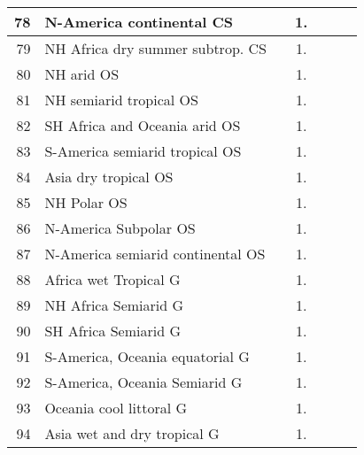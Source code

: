 {{\begin{tabular}{||r|l||c|c|c|c|c||}
 \hline
          78  & N-America continental CS                                     &       &  1.   &       &       \\
 \hline
          79  & NH Africa dry summer subtrop. CS                             &       &  1.   &       &       \\
 \hline
 \hline
          80  & NH arid OS                                                   &       &  1.   &       &       \\
 \hline
          81  & NH semiarid tropical OS                                      &       &  1.   &       &       \\
 \hline
          82  & SH Africa and Oceania arid OS                                &       &  1.   &       &       \\
 \hline
          83  & S-America semiarid tropical OS                               &       &  1.   &       &       \\
 \hline
          84  & Asia dry tropical OS                                         &       &  1.   &       &       \\
 \hline
          85  & NH Polar OS                                                  &       &  1.   &       &       \\
 \hline
          86  & N-America Subpolar OS                                        &       &  1.   &       &       \\
 \hline
          87  & N-America semiarid continental OS                            &       &  1.   &       &       \\
 \hline
 \hline
          88  & Africa wet Tropical G                                        &       &  1.   &       &       \\
 \hline
          89  & NH Africa Semiarid G                                         &       &  1.   &       &       \\
 \hline
          90  & SH Africa Semiarid G                                         &       &  1.   &       &       \\
 \hline
          91  & S-America, Oceania equatorial G                              &       &  1.   &       &       \\
 \hline
          92  & S-America, Oceania Semiarid G                                &       &  1.   &       &       \\
 \hline
          93  & Oceania cool littoral G                                      &       &  1.   &       &       \\
 \hline
          94  & Asia wet and dry tropical G                                  &       &  1.   &       &       \\

\end{tabular}}}

